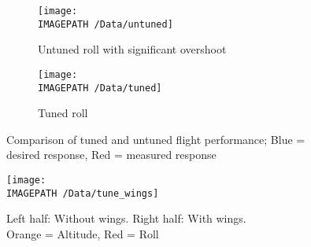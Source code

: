 \begin{figure}[!ht]
	\centering
	\begin{subfigure}{.4\textwidth}
		\centering
		\texttt{[image: \\IMAGEPATH /Data/untuned]}
		\caption{Untuned roll with significant overshoot}
		\label{fig:untunedroll}
	\end{subfigure}%
	\begin{subfigure}{.4\textwidth}
		\centering
		\texttt{[image: \\IMAGEPATH /Data/tuned]}
		\caption{Tuned roll}
		\label{fig:tunedroll}
	\end{subfigure}
	\caption{Comparison of tuned and untuned flight performance; Blue = desired response, Red = measured response}
	\label{fig:tune1}
\end{figure}

\begin{figure}[!ht]
	\centering
	\texttt{[image: \\IMAGEPATH /Data/tune\_wings]}
	\caption{Left half: Without wings. Right half: With wings.\\ Orange = Altitude, Red = Roll}
	\label{fig:tune2}
\end{figure}


